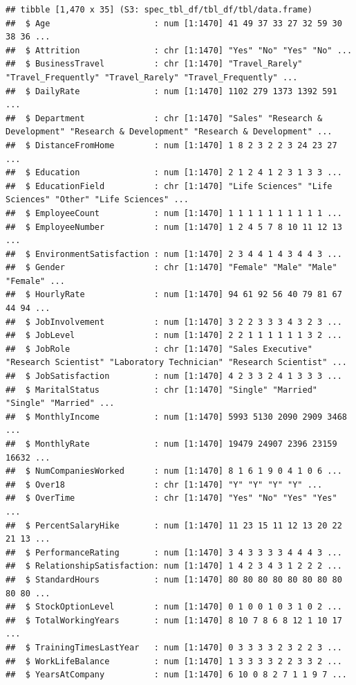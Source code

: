 \documentclass[
]{article}
\begin{document}
\begin{verbatim}
## tibble [1,470 x 35] (S3: spec_tbl_df/tbl_df/tbl/data.frame)
##  $ Age                     : num [1:1470] 41 49 37 33 27 32 59 30 38 36 ...
##  $ Attrition               : chr [1:1470] "Yes" "No" "Yes" "No" ...
##  $ BusinessTravel          : chr [1:1470] "Travel_Rarely" "Travel_Frequently" "Travel_Rarely" "Travel_Frequently" ...
##  $ DailyRate               : num [1:1470] 1102 279 1373 1392 591 ...
##  $ Department              : chr [1:1470] "Sales" "Research & Development" "Research & Development" "Research & Development" ...
##  $ DistanceFromHome        : num [1:1470] 1 8 2 3 2 2 3 24 23 27 ...
##  $ Education               : num [1:1470] 2 1 2 4 1 2 3 1 3 3 ...
##  $ EducationField          : chr [1:1470] "Life Sciences" "Life Sciences" "Other" "Life Sciences" ...
##  $ EmployeeCount           : num [1:1470] 1 1 1 1 1 1 1 1 1 1 ...
##  $ EmployeeNumber          : num [1:1470] 1 2 4 5 7 8 10 11 12 13 ...
##  $ EnvironmentSatisfaction : num [1:1470] 2 3 4 4 1 4 3 4 4 3 ...
##  $ Gender                  : chr [1:1470] "Female" "Male" "Male" "Female" ...
##  $ HourlyRate              : num [1:1470] 94 61 92 56 40 79 81 67 44 94 ...
##  $ JobInvolvement          : num [1:1470] 3 2 2 3 3 3 4 3 2 3 ...
##  $ JobLevel                : num [1:1470] 2 2 1 1 1 1 1 1 3 2 ...
##  $ JobRole                 : chr [1:1470] "Sales Executive" "Research Scientist" "Laboratory Technician" "Research Scientist" ...
##  $ JobSatisfaction         : num [1:1470] 4 2 3 3 2 4 1 3 3 3 ...
##  $ MaritalStatus           : chr [1:1470] "Single" "Married" "Single" "Married" ...
##  $ MonthlyIncome           : num [1:1470] 5993 5130 2090 2909 3468 ...
##  $ MonthlyRate             : num [1:1470] 19479 24907 2396 23159 16632 ...
##  $ NumCompaniesWorked      : num [1:1470] 8 1 6 1 9 0 4 1 0 6 ...
##  $ Over18                  : chr [1:1470] "Y" "Y" "Y" "Y" ...
##  $ OverTime                : chr [1:1470] "Yes" "No" "Yes" "Yes" ...
##  $ PercentSalaryHike       : num [1:1470] 11 23 15 11 12 13 20 22 21 13 ...
##  $ PerformanceRating       : num [1:1470] 3 4 3 3 3 3 4 4 4 3 ...
##  $ RelationshipSatisfaction: num [1:1470] 1 4 2 3 4 3 1 2 2 2 ...
##  $ StandardHours           : num [1:1470] 80 80 80 80 80 80 80 80 80 80 ...
##  $ StockOptionLevel        : num [1:1470] 0 1 0 0 1 0 3 1 0 2 ...
##  $ TotalWorkingYears       : num [1:1470] 8 10 7 8 6 8 12 1 10 17 ...
##  $ TrainingTimesLastYear   : num [1:1470] 0 3 3 3 3 2 3 2 2 3 ...
##  $ WorkLifeBalance         : num [1:1470] 1 3 3 3 3 2 2 3 3 2 ...
##  $ YearsAtCompany          : num [1:1470] 6 10 0 8 2 7 1 1 9 7 ...

\end{verbatim}
\end{document}
